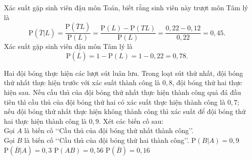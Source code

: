\begin{ex}
{\begin{itemchoice}
			\itemch Xác suất gặp sinh viên đậu môn Toán, biết rằng sinh viên này trượt môn Tâm lý  là
			$$\mathrm{P} \left(\overline{T} | L \right)=\dfrac{\mathrm{P}  \left(\overline{T}L\right)}{\mathrm{P}\left(L\right)}=\dfrac{\mathrm{P}\left(L\right)-\mathrm{P}\left(TL\right)}{\mathrm{P}\left(L\right)}=\dfrac{0{,}22-0{,}12}{0{,}22}=0{,}45.$$
			\itemch Xác suất gặp sinh viên đậu môn Tâm  lý là
			$$\mathrm{P} \left(\overline{L}\right)=1- \mathrm{P}\left( L \right)= 1-  0{,}22= 0{,}78.$$
		\end{itemchoice}
	} 
\end{ex}

\begin{ex}%
	Hai đội bóng thực hiện các lượt sút luân lưu. Trong loạt sút thứ nhất, đội bóng thứ nhất  thực hiện trước với xác suất thành công là $0{,}8$, đội bóng thứ hai thực hiện sau. Nếu cầu thủ của đội bóng thứ nhất thực hiện thành công quả đá đầu tiên thì cầu thủ của đội bóng thứ hai có xác suất thực hiện thành công là $0{,}7$; nếu đội bóng thứ nhất thực hiện không thành công thì xác suất để đội bóng thứ hai thực hiện thành công là $0{,}9$. Xét các biến cố sau:\\
	Gọi $A$ là biến cố \lq\lq Cầu thủ của  đội bóng thứ nhất thành công\rq\rq. \\
	Gọi $B$ là biến cố \lq\lq Cầu thủ của đội bóng thứ hai  thành công\rq\rq.
	 \choiceTF
		{$\mathrm{P}  \left(B|A\right)=0{,}9$}
		{\True $\mathrm{P}  \left(\overline{B}| A\right)=0{,}3$}
		 {\True $\mathrm{P} \left(AB\right)=0{,}56$}
		{$\mathrm{P} \left(\overline{B}\right)=0{,}16$} 
\end{ex}

